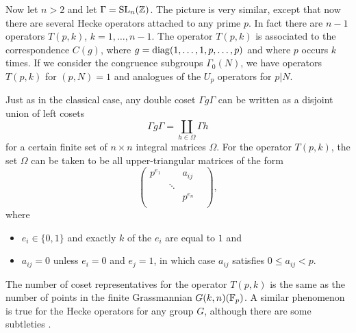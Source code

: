 \begin{example}\label{ex:heckeops}
Now let $n>2$ and let $\Gamma = \operatorname{SL}_{n} (\mathbb{Z})$. The picture is very
similar, except that now there are several Hecke operators attached to
any prime $p$.  In fact there are $n-1$ operators $T (p,k)$,
$k=1,\dotsc ,n-1$.  The operator $T (p,k)$ is associated to the
correspondence $C (g)$, where $g = \operatorname{diag} (1,\dotsc ,1,p,\dotsc ,p)$
and where $p$ occurs $k$ times.  If we consider the congruence
subgroups $\Gamma_{0} (N)$, we have operators $T (p,k)$ for
$(p,N)=1$ and analogues of the $U_{p}$ operators for $p|N$.

Just as in the classical case, any double coset $\Gamma g \Gamma$ can
be written as a disjoint union of left cosets 
\[
\Gamma g\Gamma  = \coprod_{h\in \Omega} \Gamma h
\]
for a certain finite set of $n\times n$ integral matrices $\Omega$.
For the operator $T (p,k)$, the set $\Omega$ can be taken to be all
upper-triangular matrices of the form \cite[Proposition 7.2]{krieg}
\[
\left(\begin{array}{cccc}
p^{e_{1}}&&a_{ij}\\
&\ddots&&\\
&&p^{e_{n}}&\\
\end{array} \right),
\]
where
\begin{itemize}
\item $e_{i}\in \{0,1 \}$ and exactly $k$ of the $e_{i}$ are equal to
$1$ and
\item $a_{ij}=0$ unless $e_{i}=0$ and $e_{j}=1$, in which case
$a_{ij}$ satisfies $0\leq a_{ij}<p$.
\end{itemize}


\end{example}

\begin{remark}
The number of coset representatives for the operator $T (p,k)$ is the
same as the number of points in the finite Grassmannian $G (k,n)
(\mathbb{F}_{p})$.  A similar phenomenon is true for the Hecke operators for
any group $G$, although there are some subtleties \cite{gross}.  
\end{remark}



